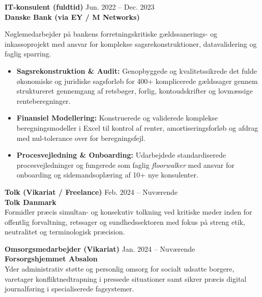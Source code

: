 \documentclass[9.5pt,a4paper]{article}
\begin{document}
\textbf{\fontsize{9.5}{11.5}\selectfont IT-konsulent (fuldtid)} \hfill {\fontsize{8.5}{10.5}\selectfont\color{mutedgray}Jun. 2022 -- Dec. 2023} \\
{\fontsize{8.5}{10.5}\selectfont\textbf{\color{accent}Danske Bank (via EY / M Networks)}} \\[2pt]
{\fontsize{8.5}{11}\selectfont\color{darkslate}
Nøglemedarbejder på bankens forretningskritiske gældssanerings- og inkassoprojekt med ansvar for komplekse sagsrekonstruktioner, datavalidering og faglig sparring.
\begin{itemize}
    \item \textbf{Sagsrekonstruktion \& Audit:} Genopbyggede og kvalitetssikrede det fulde økonomiske og juridiske sagsforløb for 400+ komplicerede gældssager gennem struktureret gennemgang af retsbøger, forlig, kontoudskrifter og lovmæssige renteberegninger.
    \item \textbf{Finansiel Modellering:} Konstruerede og validerede komplekse beregningsmodeller i Excel til kontrol af renter, amortiseringsforløb og afdrag med nul-tolerance over for beregningsfejl.
    \item \textbf{Procesvejledning \& Onboarding:} Udarbejdede standardiserede procesvejledninger og fungerede som faglig \textit{floorwalker} med ansvar for onboarding og sidemandsoplæring af 10+ nye konsulenter.
\end{itemize}
}

\vspace{3pt}

\textbf{\fontsize{9.5}{11.5}\selectfont Tolk (Vikariat / Freelance)} \hfill {\fontsize{8.5}{10.5}\selectfont\color{mutedgray}Feb. 2024 -- Nuværende} \\
{\fontsize{8.5}{10.5}\selectfont\textbf{\color{accent}Tolk Danmark}} \\[2pt]
{\fontsize{8.5}{11}\selectfont\color{darkslate}
Formidler præcis simultan- og konsekutiv tolkning ved kritiske møder inden for offentlig forvaltning, retssager og sundhedssektoren med fokus på streng etik, neutralitet og terminologisk præcision.
}

\vspace{3pt}

\textbf{\fontsize{9.5}{11.5}\selectfont Omsorgsmedarbejder (Vikariat)} \hfill {\fontsize{8.5}{10.5}\selectfont\color{mutedgray}Jan. 2024 -- Nuværende} \\
{\fontsize{8.5}{10.5}\selectfont\textbf{\color{accent}Forsorgshjemmet Absalon}} \\[2pt]
{\fontsize{8.5}{11}\selectfont\color{darkslate}
Yder administrativ støtte og personlig omsorg for socialt udsatte borgere, varetager konfliktnedtrapning i pressede situationer samt sikrer præcis digital journalføring i specialiserede fagsystemer.
}
\end{document}
